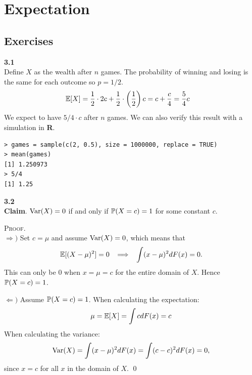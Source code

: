
\newpage
\section{Expectation}

\subsection*{Exercises}

\bigskip\noindent
\textbf{3.1}\\  %
Define $X$ as the wealth after $n$ games. The probability of winning and losing is the same
for each outcome so $p = 1/2$.
\begin{align*}
    \E[X] &= \frac{1}{2}\cdot 2c+ \frac{1}{2}\cdot \left(\frac{1}{2}\right)c
    = c + \frac{c}{4} = \frac{5}{4}c
\end{align*}
We expect to have $5/4\cdot c$ after $n$ games. We can also verify this result with a simulation
in \textbf{R}.
\begin{lstlisting}[style=RSyntax, title=R]
> games = sample(c(2, 0.5), size = 1000000, replace = TRUE)
> mean(games)
[1] 1.250973
> 5/4
[1] 1.25
\end{lstlisting}

\bigskip\noindent
\textbf{3.2}\\  %
\textbf{Claim}. $\V(X) = 0$ if and only if $\P(X = c) = 1$ for some constant $c$.

\medskip\noindent\textsc{Proof}.\\
$\Rightarrow)$ Set $c = \mu$ and assume $\V(X) = 0$, which means that
$$
\E[(X - \mu)^2] = 0
\imp
\int (x - \mu)^2dF(x) = 0.
$$
This can only be 0 when $x = \mu = c$ for the entire domain of $X$. Hence $\P(X = c) = 1$.

\medskip\noindent
$\Leftarrow)$ Assume $\P(X=c) = 1$. When calculating the expectation:
$$
\mu = \E[X] = \int c dF(x) = c
$$
When calculating the variance:
$$
\V(X) = \int (x - \mu)^2dF(x) = \int (c - c)^2dF(x) = 0,
$$
since $x = c$ for all $x$ in the domain of $X$. \qed

